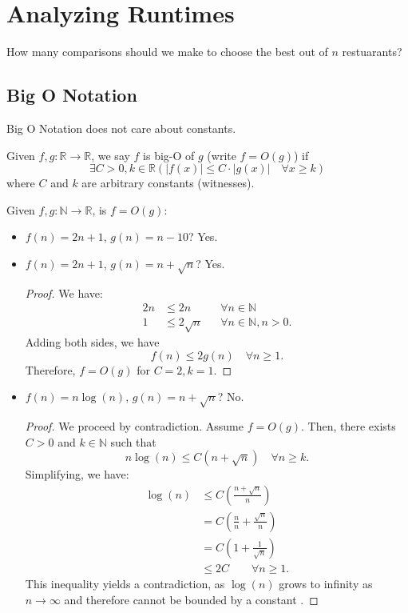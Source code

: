 \documentclass[a4paper]{article}
\begin{document}

\section{Analyzing Runtimes}

How many comparisons should we make to choose the best out of \( n \) restuarants?

\subsection{Big O Notation}
Big O Notation does not care about constants.

\begin{definition}
	Given \( f,g \colon \mathbb{R} \to \mathbb{R} \), we say \( f \) is big-O of \( g \) (write \( f=O(g) \)) if \[ \exists C>0, k \in \mathbb{R}(|f(x)| \le  C \cdot |g(x)| \quad \forall  x \ge  k) \] where \( C \) and \( k \) are arbitrary constants (witnesses).
\end{definition}

\begin{eg}
	Given \( f,g \colon \mathbb{N} \to \mathbb{R} \), is \( f=O(g) \):
	\begin{itemize}
		\item \( f(n) = 2n+1 \), \( g(n) = n - 10 \)? Yes.
		\item \( f(n) = 2n+1 \), \( g(n) = n + \sqrt{n}  \)? Yes.
			\begin{proof}
				We have:
				\begin{align*}
					2n & \le 2n && \forall  n \in \mathbb{N} \\
					1 & \le 2\sqrt{n} && \forall n \in  \mathbb{N}, n > 0
				.\end{align*}
				Adding both sides, we have \[
					f(n) \le  2g(n) \quad \forall n\ge 1
				.\] Therefore, \( f = O(g) \) for \( C = 2, k = 1 \).
			\end{proof}
		\item \( f(n) = n\log (n) \), \( g(n) = n + \sqrt{n}  \)? No.
			\begin{proof}
				We proceed by contradiction. Assume \( f = O(g) \). Then, there exists \( C>0 \) and \( k \in \mathbb{N} \) such that \[
					n\log (n) \le  C(n + \sqrt{n} ) \quad \forall n \ge k
				.\] Simplifying, we have: 
				\begin{align*}
					\log (n) & \le  C \left(\frac{n+ \sqrt{n}}{n}\right) \\
										& = C\left(\frac{n}{n} + \frac{\sqrt{n}}{n}\right) \\
										& = C\left(1 + \frac{1}{\sqrt{n} }\right) \\
										& \le 2C \qquad \forall n \ge  1
				.\end{align*}
				This inequality yields a contradiction, as \( \log (n) \) grows to infinity as \( n \to \infty \) and therefore cannot be bounded by a constant \contra.
			\end{proof}
	\end{itemize}
\end{eg}
\end{document}
